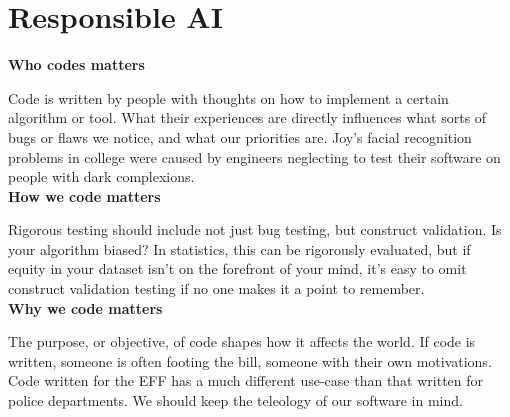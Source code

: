 \documentclass[11pt,largemargins, anonymous]{homework}
\begin{document}
\maketitle

\part{Responsible AI}

\question

\textbf{Who codes matters}

Code is written by people with thoughts on how to implement a certain algorithm or tool.
What their experiences are directly influences what sorts of bugs or flaws we notice,
and what our priorities are.
Joy's facial recognition problems in college were caused by engineers
neglecting to test their software on people with dark complexions.
\\

\textbf{How we code matters}

Rigorous testing should include not just bug testing, but construct validation.
Is your algorithm biased? In statistics, this can be rigorously evaluated,
but if equity in your dataset isn't on the forefront of your mind,
it's easy to omit construct validation testing if no one makes it a point to remember.
\\

\textbf{Why we code matters}

The purpose, or objective, of code shapes how it affects the world.
If code is written, someone is often footing the bill, someone with their own motivations.
Code written for the EFF has a much different use-case than that written for police departments.
We should keep the teleology of our software in mind.

\question
\end{document}
